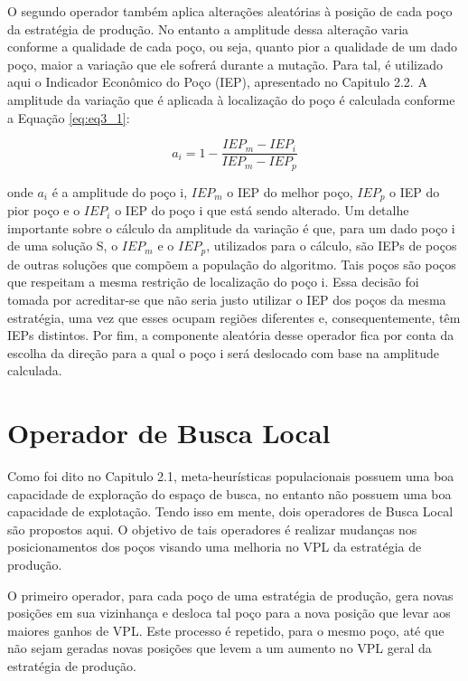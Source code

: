 O segundo operador também aplica alterações aleatórias à posição de cada poço da estratégia de produção. No entanto a amplitude dessa alteração varia conforme a qualidade de cada poço, ou seja, quanto pior a qualidade de um dado poço, maior a variação que ele sofrerá durante a mutação. Para tal, é utilizado aqui o Indicador Econômico do Poço (IEP), apresentado no Capitulo 2.2. A amplitude da variação que é aplicada à localização do poço é calculada conforme a Equação \ref{eq:eq3_1}:

\begin{equation}
  \label{eq:eq3_1}
  a_i = 1 - \frac{IEP_m -IEP_i}{IEP_m -IEP_p}
\end{equation}

onde $a_i$ é a amplitude do poço i, $IEP_m$ o IEP do melhor poço, $IEP_p$ o IEP do pior poço e o $IEP_i$  o IEP do poço i que está sendo alterado. Um detalhe importante sobre o cálculo da amplitude da variação é que, para um dado poço i de uma solução S, o $IEP_m$ e o $IEP_p$, utilizados para o cálculo, são IEPs de poços de outras soluções que compõem a população do algoritmo. Tais poços são poços que respeitam a mesma restrição de localização do poço i. Essa decisão foi tomada por acreditar-se que não seria justo utilizar o IEP dos poços da mesma estratégia, uma vez que esses ocupam regiões diferentes e, consequentemente, têm IEPs distintos. Por fim, a componente aleatória desse operador fica por conta da escolha da direção para a qual o poço i será deslocado com base na amplitude calculada.

\section{Operador de Busca Local}
\label{ch:3_OperadorBuscaLocal}
Como foi dito no Capitulo 2.1, meta-heurísticas populacionais possuem uma boa capacidade de exploração do espaço de busca, no entanto não possuem uma boa capacidade de explotação. Tendo isso em mente, dois operadores de Busca Local são propostos aqui. O objetivo de tais operadores é realizar mudanças nos posicionamentos dos poços visando uma melhoria no VPL da estratégia de produção.

O primeiro operador, para cada poço de uma estratégia de produção, gera novas posições em sua vizinhança e desloca tal poço para a nova posição que levar aos maiores ganhos de VPL. Este processo é repetido, para o mesmo poço, até que não sejam geradas novas posições que levem a um aumento no VPL geral da estratégia de produção.


